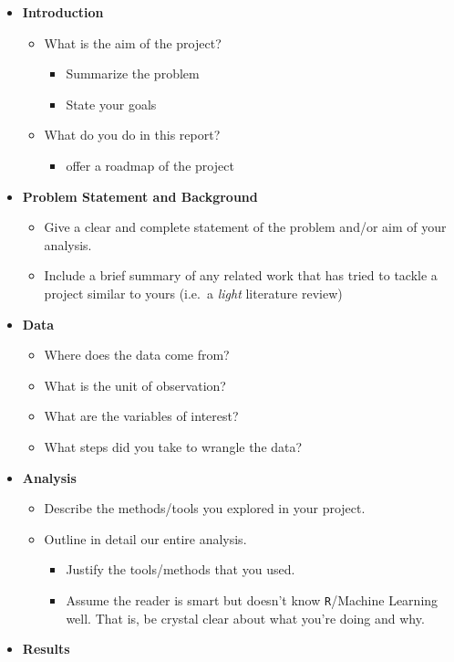 \documentclass[
  12pt,
]{article}
\providecommand{\tightlist}{%
  \setlength{\itemsep}{0pt}\setlength{\parskip}{0pt}}
\begin{document}
\begin{itemize}
\item
  \textbf{Introduction}

  \begin{itemize}
  \tightlist
  \item
    What is the aim of the project?

    \begin{itemize}
    \tightlist
    \item
      Summarize the problem
    \item
      State your goals
    \end{itemize}
  \item
    What do you do in this report?

    \begin{itemize}
    \tightlist
    \item
      offer a roadmap of the project
    \end{itemize}
  \end{itemize}
\item
  \textbf{Problem Statement and Background}

  \begin{itemize}
  \item
    Give a clear and complete statement of the problem and/or aim of
    your analysis.
  \item
    Include a brief summary of any related work that has tried to tackle
    a project similar to yours (i.e.~a \emph{light} literature review)
  \end{itemize}
\item
  \textbf{Data}

  \begin{itemize}
  \item
    Where does the data come from?
  \item
    What is the unit of observation?
  \item
    What are the variables of interest?
  \item
    What steps did you take to wrangle the data?
  \end{itemize}
\item
  \textbf{Analysis}

  \begin{itemize}
  \item
    Describe the methods/tools you explored in your project.
  \item
    Outline in detail our entire analysis.

    \begin{itemize}
    \tightlist
    \item
      Justify the tools/methods that you used.
    \item
      Assume the reader is smart but doesn't know \texttt{R}/Machine
      Learning well. That is, be crystal clear about what you're doing
      and why.
    \end{itemize}
  \end{itemize}
\item
  \textbf{Results}


\end{itemize}
\end{document}
